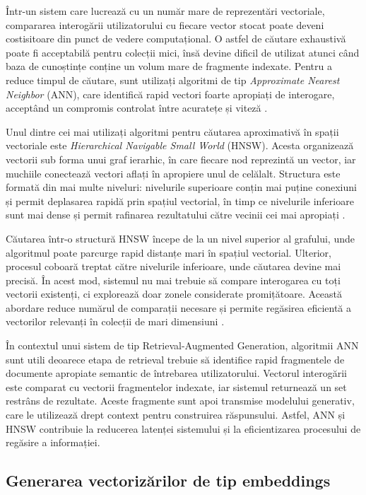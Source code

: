 \documentclass[12pt, a4paper, oneside, romanian]{teza-upb}
\begin{document}
Într-un sistem care lucrează cu un număr mare de reprezentări vectoriale, compararea interogării utilizatorului cu fiecare vector stocat poate deveni costisitoare din punct de vedere computațional. O astfel de căutare exhaustivă poate fi acceptabilă pentru colecții mici, însă devine dificil de utilizat atunci când baza de cunoștințe conține un volum mare de fragmente indexate. Pentru a reduce timpul de căutare, sunt utilizați algoritmi de tip \textit{Approximate Nearest Neighbor} (ANN), care identifică rapid vectori foarte apropiați de interogare, acceptând un compromis controlat între acuratețe și viteză \cite{malkov2018hnsw}.

Unul dintre cei mai utilizați algoritmi pentru căutarea aproximativă în spații vectoriale este \textit{Hierarchical Navigable Small World} (HNSW). Acesta organizează vectorii sub forma unui graf ierarhic, în care fiecare nod reprezintă un vector, iar muchiile conectează vectori aflați în apropiere unul de celălalt. Structura este formată din mai multe niveluri: nivelurile superioare conțin mai puține conexiuni și permit deplasarea rapidă prin spațiul vectorial, în timp ce nivelurile inferioare sunt mai dense și permit rafinarea rezultatului către vecinii cei mai apropiați \cite{malkov2018hnsw}.

Căutarea într-o structură HNSW începe de la un nivel superior al grafului, unde algoritmul poate parcurge rapid distanțe mari în spațiul vectorial. Ulterior, procesul coboară treptat către nivelurile inferioare, unde căutarea devine mai precisă. În acest mod, sistemul nu mai trebuie să compare interogarea cu toți vectorii existenți, ci explorează doar zonele considerate promițătoare. Această abordare reduce numărul de comparații necesare și permite regăsirea eficientă a vectorilor relevanți în colecții de mari dimensiuni \cite{malkov2018hnsw}.

În contextul unui sistem de tip Retrieval-Augmented Generation, algoritmii ANN sunt utili deoarece etapa de retrieval trebuie să identifice rapid fragmentele de documente apropiate semantic de întrebarea utilizatorului. Vectorul interogării este comparat cu vectorii fragmentelor indexate, iar sistemul returnează un set restrâns de rezultate. Aceste fragmente sunt apoi transmise modelului generativ, care le utilizează drept context pentru construirea răspunsului. Astfel, ANN și HNSW contribuie la reducerea latenței sistemului și la eficientizarea procesului de regăsire a informației.

\subsection{Generarea vectorizărilor de tip embeddings}
\end{document}
